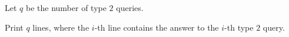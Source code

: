Let $q$ be the number of type $2$ queries. 

Print $q$ lines, where the $i$-th line contains the answer to the $i$-th type $2$ query.